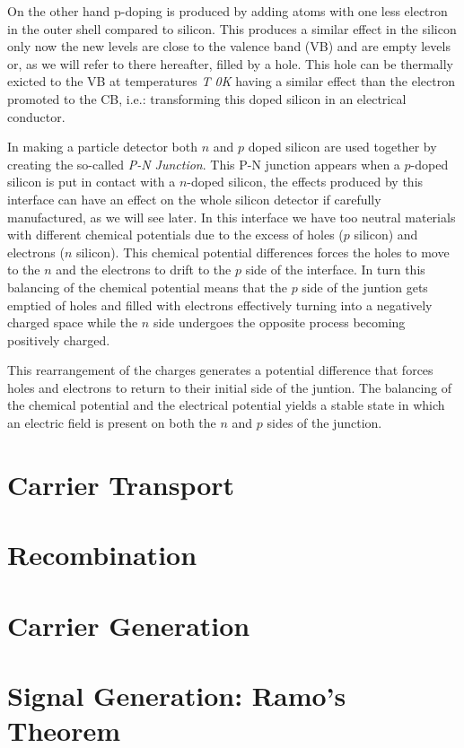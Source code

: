 On the other hand p-doping is produced by adding atoms with one less electron in the outer shell compared to silicon. This produces a similar effect in the silicon only now the new levels are close to the valence band (VB) and are empty levels or, as we will refer to there hereafter, filled by a hole. This hole can be thermally exicted to the VB at temperatures \textit{T \beq 0K} having a similar effect than the electron promoted to the CB, i.e.: transforming this doped silicon in an electrical conductor.

In making a particle detector both $n$ and $p$ doped silicon are used together by creating the so-called \textit{P-N Junction}. This P-N junction appears when a $p$-doped silicon is put in contact with a $n$-doped silicon, the effects produced by this interface can have an effect on the whole silicon detector if carefully manufactured, as we will see later. In this interface we have too neutral materials with different chemical potentials due to the excess of holes ($p$ silicon) and electrons ($n$ silicon). This chemical potential differences forces the holes to move to the $n$ and the electrons to drift to the $p$ side of the interface. In turn this balancing of the chemical potential means that the $p$ side of the juntion gets emptied of holes and filled with electrons effectively turning into a negatively charged space while the $n$ side undergoes the opposite process becoming positively charged.

This rearrangement of the charges generates a potential difference that forces holes and electrons to return to their initial side of the juntion. The balancing of the chemical potential and the electrical potential yields a stable state in which an electric field is present on both the $n$ and $p$ sides of the junction.  


\section{Carrier Transport}


\section{Recombination} 

\section{Carrier Generation}

\section{Signal Generation: Ramo's Theorem} %

